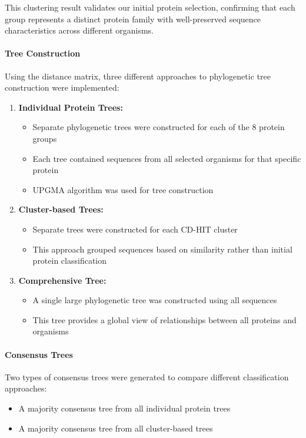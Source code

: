 \documentclass[11pt, a4paper, hidelinks]{article}
\begin{document}
This clustering result validates our initial protein selection, confirming that each group represents a distinct protein family with well-preserved sequence characteristics across different organisms.

\paragraph{Tree Construction}
Using the distance matrix, three different approaches to phylogenetic tree construction were implemented:

\begin{enumerate}
    \item \textbf{Individual Protein Trees:}
    \begin{itemize}
        \item Separate phylogenetic trees were constructed for each of the 8 protein groups
        \item Each tree contained sequences from all selected organisms for that specific protein
        \item UPGMA algorithm was used for tree construction
    \end{itemize}

    \item \textbf{Cluster-based Trees:}
    \begin{itemize}
        \item Separate trees were constructed for each CD-HIT cluster
        \item This approach grouped sequences based on similarity rather than initial protein classification
    \end{itemize}

    \item \textbf{Comprehensive Tree:}
    \begin{itemize}
        \item A single large phylogenetic tree was constructed using all sequences
        \item This tree provides a global view of relationships between all proteins and organisms
    \end{itemize}
\end{enumerate}

\paragraph{Consensus Trees}
Two types of consensus trees were generated to compare different classification approaches:
\begin{itemize}
    \item A majority consensus tree from all individual protein trees
    \item A majority consensus tree from all cluster-based trees
\end{itemize}
\end{document}
